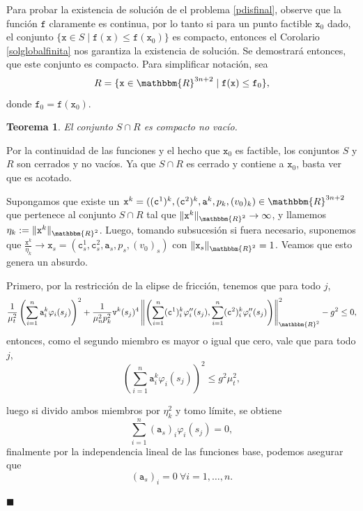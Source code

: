 \documentclass[a4paper,10pt]{book}
\newcommand{\R}{\mathbbm{R}}
\newtheorem{teo}{Teorema}%
\newenvironment{dem}{\vspace*{-0.1cm}{\it Demostraci\'on:}}{\hfill
$\blacksquare$\\}
\begin{document}
Para probar la existencia de solución de el problema \eqref{pdisfinal}, observe que la función $\texttt{f}$ claramente es continua, por lo tanto si para un punto factible $\texttt{x}_0$ dado, el conjunto $\{\texttt{x}\in S\mid \texttt{f}(\texttt{x})\leq \texttt{f}(\texttt{x}_0)\}$ es compacto, entonces el Corolario \ref{solglobalfinita} nos garantiza la existencia de solución. Se demostrará entonces, que este conjunto es compacto. Para simplificar notación, sea 
$$R=\{\texttt{x}\in\R^{3n+2}\mid \texttt{f}(\texttt{x})\leq \texttt{f}_0\},$$
donde $\texttt{f}_0=\texttt{f}(\texttt{x}_0)$.
\begin{teo}
El conjunto $S\cap R$ es compacto no vacío.
\end{teo}
\begin{dem}
Por la continuidad de las funciones y el hecho que $\texttt{x}_0$ es factible, los conjuntos $S$ y $R$ son cerrados y no vacíos. Ya que $S\cap R$ es cerrado y contiene a $\texttt{x}_0$, basta ver que es acotado.

Supongamos que existe un $\texttt{x}^k=((\texttt{c}^{1})^k,(\texttt{c}^{2})^k,\texttt{a}^k,p_k,(v_0)_k)\in\R^{3n+2}$ que pertenece al conjunto $S\cap R$  tal que $\|\texttt{x}^k\|_{\R^2}\to\infty$, y llamemos $\eta_k:=\|\texttt{x}^k\|_{\R^2}$. Luego, tomando subsucesión si fuera necesario, suponemos que $\frac{\texttt{x}^k}{\eta_k}\to\texttt{x}_s=(\texttt{c}^1_s,\texttt{c}^2_s,\texttt{a}_s,p_s,(v_0)_s)$ con $\|\texttt{x}_s\|_{\R^2}=1$. Veamos que esto genera un absurdo.

Primero, por la restricción de la elipse de fricción, tenemos que para todo $j$, $$\frac{1}{\mu_t^2} \left(\sum_{i=1}^n\texttt{a}^k_i\varphi_i(s_j)\right)^2 + \frac{1}{\mu_n^2 p_k^2}\texttt{v}^k(s_j)^4\left\| \left(\sum_{i=1}^n(\texttt{c}^{1})^k_i\varphi_i''(s_j), \sum_{i=1}^n(\texttt{c}^{2})^k_i\varphi_i''(s_j)\right) \right\|_{\R^2}^2-g^2\leq 0,$$
entonces, como el segundo miembro es mayor o igual que cero, vale que para todo $j$,
\begin{equation}\label{restriccionfriccionmodificada}
    \left(\sum_{i=1}^n\texttt{a}^k_i\varphi_i(s_j)\right)^2\leq g^2\mu_t^2,
\end{equation}



luego si divido ambos miembros por $\eta_k^2$ y tomo límite, se obtiene
$$\sum_{i=1}^n(\texttt{a}_s)_i\varphi_i(s_j)=0,$$
finalmente por la independencia lineal de las funciones base, podemos asegurar que
\begin{equation}\label{aigualacero}
    (\texttt{a}_s)_i=0 \ \forall i=1,\ldots,n.
\end{equation}


\end{dem}
\end{document}
